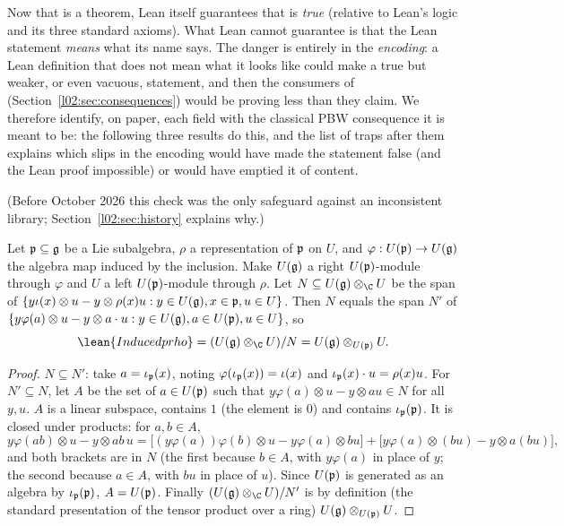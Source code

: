 Now that  is a theorem, Lean itself guarantees that  is \emph{true} (relative
to Lean's logic and its three standard axioms). What Lean cannot guarantee is that the Lean statement
\emph{means} what its name says. The danger is entirely in the \emph{encoding}: a Lean definition that
does not mean what it looks like could make  a true but weaker, or even vacuous,
statement, and then the consumers of  (Section~\ref{l02:sec:consequences}) would be proving
less than they claim. We therefore identify, on paper, each field with the classical PBW consequence it
is meant to be: the following three results do this, and the list of traps after them explains which
slips in the encoding would have made the statement false (and the Lean proof impossible) or would have
emptied it of content.

(Before October 2026 this check was the only safeguard against an inconsistent library;
Section~\ref{l02:sec:history} explains why.)

\begin{proposition}\label{l02:prop:induced}
Let $\mathfrak{p}\subseteq\mathfrak{g}$ be a Lie subalgebra, $\rho$ a representation of $\mathfrak{p}$ on $U$, and
$\varphi : U(\mathfrak{p})\to U(\mathfrak{g})$ the algebra map induced by the inclusion. Make $U(\mathfrak{g})$ a right
$U(\mathfrak{p})$-module through $\varphi$ and $U$ a left $U(\mathfrak{p})$-module through $\rho$. Let
$N\subseteq U(\ltwog)\otimes_\C U$ be the span of $\{y\iota(x)\otimes u - y\otimes\rho(x)u : y\in U(\mathfrak{g}),
x\in\mathfrak{p},u\in U\}$. Then $N$ equals the span $N'$ of
$\{y\varphi(a)\otimes u - y\otimes a\cdot u : y\in U(\mathfrak{g}), a\in U(\mathfrak{p}), u\in U\}$, so
\begin{equation*}
 \lean{Induced p rho} = (U(\ltwog)\otimes_\C U)/N = U(\ltwog)\otimes_{U(\ltwop)}U.
\end{equation*}
\end{proposition}

\begin{proof}
$N\subseteq N'$: take $a = \iota_{\mathfrak{p}}(x)$, noting $\varphi(\iota_{\mathfrak{p}}(x)) = \iota(x)$ and
$\iota_{\mathfrak{p}}(x)\cdot u = \rho(x)u$. For $N'\subseteq N$, let $A$ be the set of $a\in U(\mathfrak{p})$ such that
$y\varphi(a)\otimes u - y\otimes a u\in N$ for all $y, u$. $A$ is a linear subspace, contains $1$
(the element is $0$) and contains $\iota_{\mathfrak{p}}(\mathfrak{p})$. It is closed under products: for $a,b\in A$,
\begin{equation*}
 y\varphi(ab)\otimes u - y\otimes ab\,u = \bigl[(y\varphi(a))\varphi(b)\otimes u - y\varphi(a)\otimes b u\bigr]
 + \bigl[y\varphi(a)\otimes (bu) - y\otimes a(bu)\bigr],
\end{equation*}
and both brackets are in $N$ (the first because $b\in A$, with $y\varphi(a)$ in place of $y$; the
second because $a\in A$, with $bu$ in place of $u$). Since $U(\mathfrak{p})$ is generated as an algebra by
$\iota_{\mathfrak{p}}(\mathfrak{p})$, $A = U(\mathfrak{p})$. Finally $(U(\ltwog)\otimes_\C U)/N'$ is by definition (the
standard presentation of the tensor product over a ring) $U(\mathfrak{g})\otimes_{U(\mathfrak{p})}U$.
\end{proof}

